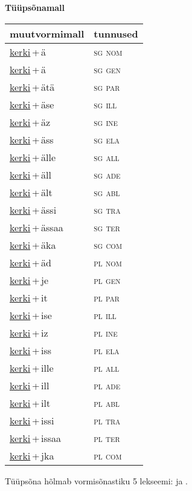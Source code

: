 
\vspace{1.8em}
\begin{minipage}{\textwidth}
\textbf{Tüüpsõnamall \,}\\

\begin{sideways}
\begin{tabular}{l l}
muutvormimall & tunnused \\
\hline
\underline{kerki}\,+\,ä & \textsc{ sg nom } \\
\underline{kerki}\,+\,ä & \textsc{ sg gen } \\
\underline{kerki}\,+\,ätä & \textsc{ sg par } \\
\underline{kerki}\,+\,äse & \textsc{ sg ill } \\
\underline{kerki}\,+\,äz & \textsc{ sg ine } \\
\underline{kerki}\,+\,äss & \textsc{ sg ela } \\
\underline{kerki}\,+\,älle & \textsc{ sg all } \\
\underline{kerki}\,+\,äll & \textsc{ sg ade } \\
\underline{kerki}\,+\,ält & \textsc{ sg abl } \\
\underline{kerki}\,+\,ässi & \textsc{ sg tra } \\
\underline{kerki}\,+\,ässaa & \textsc{ sg ter } \\
\underline{kerki}\,+\,äka & \textsc{ sg com } \\
\underline{kerki}\,+\,äd & \textsc{ pl nom } \\
\underline{kerki}\,+\,je & \textsc{ pl gen } \\
\underline{kerki}\,+\,it & \textsc{ pl par } \\
\underline{kerki}\,+\,ise & \textsc{ pl ill } \\
\underline{kerki}\,+\,iz & \textsc{ pl ine } \\
\underline{kerki}\,+\,iss & \textsc{ pl ela } \\
\underline{kerki}\,+\,ille & \textsc{ pl all } \\
\underline{kerki}\,+\,ill & \textsc{ pl ade } \\
\underline{kerki}\,+\,ilt & \textsc{ pl abl } \\
\underline{kerki}\,+\,issi & \textsc{ pl tra } \\
\underline{kerki}\,+\,issaa & \textsc{ pl ter } \\
\underline{kerki}\,+\,jka & \textsc{ pl com } \\
\end{tabular}
\end{sideways}
\label{tab:tüüpsõnamall-kerkiä}

\end{minipage}

 
\vspace{1em}
\noindent Tüüpsõna hõlmab vormisõnastiku 5 lekseemi:  ja .

